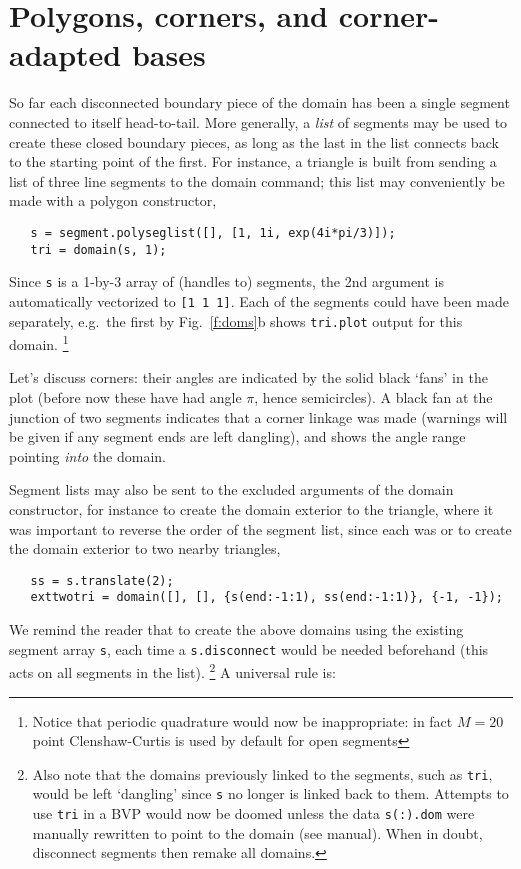 

\section{Polygons, corners, and corner-adapted bases}
\label{s:poly}

So far each disconnected boundary piece of the domain
has been a single segment connected to itself head-to-tail.
More generally, a {\em list} of segments may be used to create 
these closed boundary pieces, as long as the last in the list
connects back to the starting point of the first.
For instance, a triangle is built from sending a list of
three line segments to the domain command;
this list may conveniently be made with a polygon constructor,
\begin{verbatim}
   s = segment.polyseglist([], [1, 1i, exp(4i*pi/3)]);
   tri = domain(s, 1);
\end{verbatim}
Since {\tt s} is a 1-by-3 array of (handles to) segments,
the 2nd argument is automatically vectorized to {\tt [1 1 1]}.
Each of the segments could have been made separately, e.g.\ the first by
Fig.~\ref{f:doms}b shows {\tt tri.plot} output for this domain.%
  \footnote{Notice that periodic quadrature would now be inappropriate:
    in fact $M=20$ point Clenshaw-Curtis is used by default for open
    segments}

Let's discuss corners: their angles are indicated by the solid black
`fans' in the plot (before now these have had angle $\pi$, hence semicircles).
A black fan at the junction of two segments indicates that a corner
linkage was made (warnings will be given if any segment ends are left
dangling), and shows the angle range pointing {\em into} the domain.

Segment lists may also be sent to the excluded arguments of the
domain constructor, for instance to create the domain exterior
to the triangle,
where it was important to reverse the order of the segment list,
since each was 
or to create the domain exterior to two nearby triangles,
\begin{verbatim}
   ss = s.translate(2);
   exttwotri = domain([], [], {s(end:-1:1), ss(end:-1:1)}, {-1, -1});
\end{verbatim}
We remind the reader that to create the above domains
using the existing segment array {\tt s}, each time a {\tt s.disconnect}
would be needed beforehand (this acts on all segments in the list).%
  \footnote{Also note that the domains previously linked to the segments, such
    as {\tt tri}, would be left `dangling' since {\tt s} no longer is linked
    back to them. Attempts to use {\tt tri} in a BVP would now be doomed
    unless the data {\tt s(:).dom} were manually rewritten to point to
    the domain (see manual). When in doubt, disconnect segments then remake
    all domains.}
A universal rule is:
\begin{center}\end{center}

